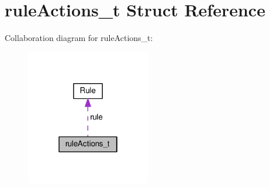 \hypertarget{structruleActions__t}{}\section{rule\+Actions\+\_\+t Struct Reference}
\label{structruleActions__t}


Collaboration diagram for rule\+Actions\+\_\+t\+:
\nopagebreak
\begin{figure}[H]
\begin{center}
\leavevmode
\includegraphics[width=154pt]{structruleActions__t__coll__graph}
\end{center}
\end{figure}
